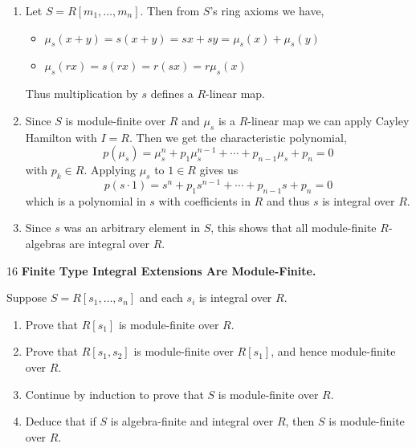 \documentclass[Notebook.tex]{subfiles}
\begin{document}
\begin{solution}
    \bbni
    \begin{enumerate}
        \item Let $S = R[m_1, \ldots, m_n]$. Then from $S$'s ring axioms we have, 
        \begin{itemize}
            \item $\mu_s(x+y) = s(x+y) = sx + sy = \mu_s(x) + \mu_s(y)$ 
            \item $\mu_s(rx) = s(rx) = r(sx) = r \mu_s(x)$ 
        \end{itemize}
        Thus multiplication by $s$ defines a $R$-linear map. 

        \item Since $S$ is module-finite over $R$ and $\mu_s$ is a $R$-linear map we can apply Cayley Hamilton with $I = R$. Then we get the characteristic polynomial, 
        \[p(\mu_s) = \mu_s^n + p_1\mu_s^{n-1} + \cdots + p_{n-1}\mu_s + p_n = 0\]
        with $p_k \in R$. Applying $\mu_s$ to $1 \in R$ gives us
        \[p(s \cdot 1) = s^n + p_1s^{n-1} + \cdots + p_{n-1}s + p_n = 0\]
        which is a polynomial in $s$ with coefficients in $R$ and thus $s$ is integral over $R$. 

        \item Since $s$ was an arbitrary element in $S$, this shows that all module-finite $R$-algebras are integral over $R$. 
    \end{enumerate}
\end{solution}

\newpage 

\begin{problem}{16}
    \textbf{Finite Type Integral Extensions Are Module-Finite.} 
    
    Suppose $S=R[s_1,\ldots,s_n]$ and each $s_i$ is integral over $R$.
    \begin{enumerate}
        \item Prove that $R[s_1]$ is module-finite over $R$.
        \item Prove that $R[s_1,s_2]$ is module-finite over $R[s_1]$, and hence module-finite over $R$.
        \item Continue by induction to prove that $S$ is module-finite over $R$.
        \item Deduce that if $S$ is algebra-finite and integral over $R$, then $S$ is module-finite over $R$.
    \end{enumerate}
\end{problem}
\end{document}
